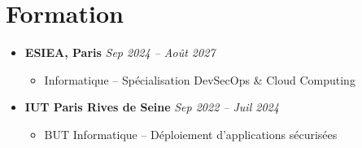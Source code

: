 \section{\icon{\faGraduationCap} Formation}
\begin{itemize}
    \item {\textbf{\color{mainblue}ESIEA, Paris}} \hfill \textit{Sep 2024 -- Août 2027}
    \begin{itemize}
        \item Informatique -- Spécialisation DevSecOps \& Cloud Computing
    \end{itemize}

    \item {\textbf{\color{mainblue}IUT Paris Rives de Seine}} \hfill \textit{Sep 2022 -- Juil 2024}
    \begin{itemize}
        \item BUT Informatique -- Déploiement d'applications sécurisées
    \end{itemize}
\end{itemize}